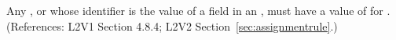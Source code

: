 Any \Compartment, \Species or \Parameter whose identifier is the value of a
 field in an \AssignmentRule, must have a value of
 for .  (References: L2V1 Section 4.8.4; L2V2
Section~\ref{sec:assignmentrule}.)
